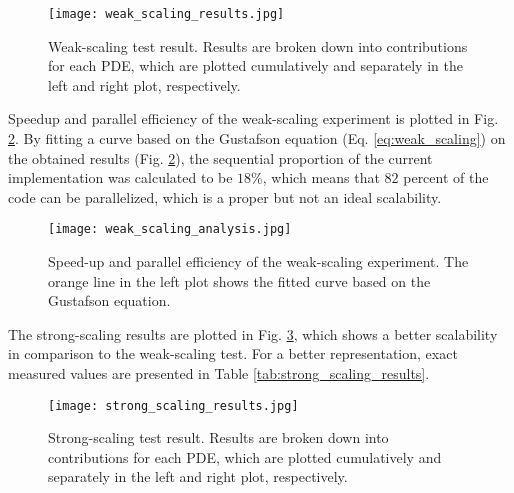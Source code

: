 \begin{figure}[h]
\centering
\medskip
\texttt{[image: weak\_scaling\_results.jpg]}
\caption[Weak-scaling test result]{Weak-scaling test result. Results are broken down into contributions for each {PDE}, which are plotted  cumulatively and separately in the left and right plot, respectively.} \label{fig:weak_scaling_results}
\end{figure}

Speedup and parallel efficiency of the weak-scaling experiment is plotted in Fig. \ref{fig:weak_scaling_analysis}.  By fitting a curve based on the Gustafson equation (Eq. \ref{eq:weak_scaling}) on the obtained results (Fig. \ref{fig:weak_scaling_analysis}), the sequential proportion of the current implementation was calculated to be $18\%$, which means that  $82$ percent of the code can be parallelized, which is a proper but not an ideal scalability.

\begin{figure}[h]
\centering
\medskip
\texttt{[image: weak\_scaling\_analysis.jpg]}
\caption[Speed-up and parallel efficiency of the weak-scaling experiment]{Speed-up and parallel efficiency of the weak-scaling experiment. The orange line in the left plot shows the fitted curve based on the Gustafson equation.} \label{fig:weak_scaling_analysis}
\end{figure}

The strong-scaling results are plotted in Fig. \ref{fig:strong_scaling_results}, which shows a better scalability in comparison to the weak-scaling test. For a better representation, exact measured values are presented in Table \ref{tab:strong_scaling_results}.


\begin{figure}[h]
\centering
\medskip
\texttt{[image: strong\_scaling\_results.jpg]}
\caption[Strong-scaling test result]{Strong-scaling test result. Results are broken down into contributions  for each {PDE}, which are plotted  cumulatively and separately in the left and right plot, respectively.} \label{fig:strong_scaling_results}
\end{figure}

